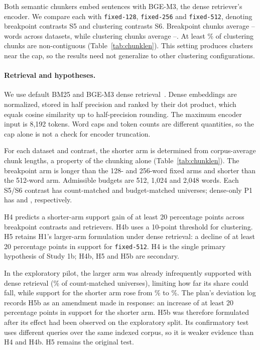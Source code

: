 \documentclass[11pt]{article}
\newcommand{\chunk}[1]{\texttt{#1}}
\begin{document}
Both semantic chunkers embed sentences with BGE-M3, the dense retriever's encoder. We compare each with \chunk{fixed-128}, \chunk{fixed-256} and \chunk{fixed-512}, denoting breakpoint contrasts S5 and clustering contrasts S6. Breakpoint chunks average \SemBpMin--\SemBpMax{} words across datasets, while clustering chunks average \SemClMin--\SemClMax{}. At least \SemClNoncontigMin\% of clustering chunks are non-contiguous (Table~\ref{tab:chunklen}). This setting produces clusters near the cap, so the results need not generalize to other clustering configurations.

\paragraph{Retrieval and hypotheses.}
We use default BM25 and BGE-M3 dense retrieval~\cite{chen2024bgem3}. Dense embeddings are normalized, stored in half precision and ranked by their dot product, which equals cosine similarity up to half-precision rounding. The maximum encoder input is 8,192 tokens. Word caps and token counts are different quantities, so the cap alone is not a check for encoder truncation.

For each dataset and contrast, the shorter arm is determined from corpus-average chunk lengths, a property of the chunking alone (Table~\ref{tab:chunklen}). The breakpoint arm is longer than the 128- and 256-word fixed arms and shorter than the 512-word arm. Admissible budgets are 512, 1,024 and 2,048 words. Each S5/S6 contrast has \SfiveUniversesCount{} count-matched and \SfiveUniversesBudget{} budget-matched universes; dense-only P1 has \PoneDenseUniversesCount{} and \PoneDenseUniversesBudget{}, respectively.

H4 predicts a shorter-arm support gain of at least 20 percentage points across breakpoint contrasts and retrievers. H4b uses a 10-point threshold for clustering. H5 retains H1's larger-arm formulation under dense retrieval: a decline of at least 20 percentage points in support for \chunk{fixed-512}. H4 is the single primary hypothesis of Study 1b; H4b, H5 and H5b are secondary.

In the exploratory pilot, the larger arm was already infrequently supported with dense retrieval (\HFivePilotCountFiveTwelve\% of count-matched universes), limiting how far its share could fall, while support for the shorter arm rose from \HFiveBPilotCount\% to \HFiveBPilotBudget\%. The plan's deviation log records H5b as an amendment made in response: an increase of at least 20 percentage points in support for the shorter arm. H5b was therefore formulated after its effect had been observed on the exploratory split. Its confirmatory test uses different queries over the same indexed corpus, so it is weaker evidence than H4 and H4b. H5 remains the original test.
\end{document}

